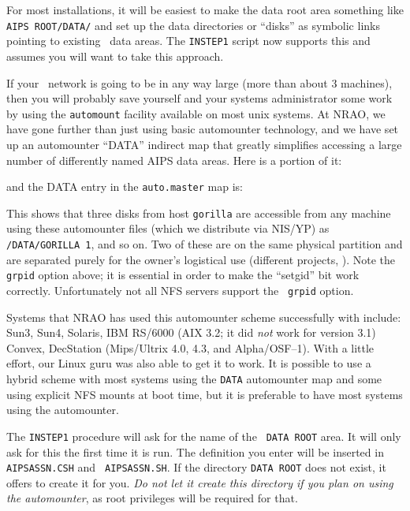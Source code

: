 For most installations, it will be easiest to make the data root area
something like {\tt\dol AIPS ROOT/\-DATA/} and set up the data
directories or ``disks'' as symbolic links pointing to existing
\AIPS\ data areas.  The {\tt INSTEP1} script now supports this and assumes
you will want to take this approach.

If your \AIPS\ network is going to be in any way large (more than about 3
machines), then you will probably save yourself and your systems
administrator some work by using the {\tt automount} facility available on
most unix systems.  At NRAO, we have gone further than just using basic
automounter technology, and we have set up an automounter ``DATA''
indirect map that greatly simplifies accessing a large number of
differently named AIPS data areas.  Here is a portion of it: \medskip

\medskip

\noindent and the DATA entry in the {\tt auto.master} map is:\medskip


\noindent This shows that three disks from host {\tt gorilla} are
accessible from any machine using these automounter files (which we
distribute via NIS/YP) as {\tt /DATA/GORILLA 1}, and so on.  Two of
these are on the same physical partition and are separated purely for
the owner's logistical use (different projects, \etc).  Note the {\tt
grpid} option above; it is essential in order to make the ``setgid'' bit
work correctly.  Unfortunately not all NFS servers support the {\tt
grpid} option.

Systems that NRAO has used this automounter scheme successfully with
include: Sun3, Sun4, Solaris, IBM RS/6000 (AIX 3.2; it did {\it not\/}
work for version 3.1) Convex, DecStation (Mips/Ultrix 4.0, 4.3, and
Alpha/OSF--1).  With a little effort, our Linux guru was also able to get
it to work.  It is possible to use a hybrid scheme with most systems using
the {\tt DATA} automounter map and some using explicit NFS mounts at boot
time, but it is preferable to have most systems using the automounter.

The {\tt INSTEP1} procedure will ask for the name of the {\tt
DATA ROOT} area.  It will only ask for this the first time it is run.
The definition you enter will be inserted in {\tt AIPSASSN.CSH} and {\tt
AIPSASSN.SH}.  If the directory {\tt DATA ROOT} does not exist, it
offers to create it for you.  {\it Do not let it create this directory
if you plan on using the automounter\/}, as root privileges will be
required for that.

